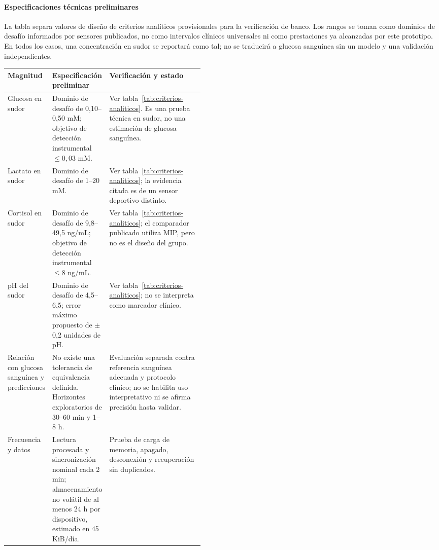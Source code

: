 \paragraph{Especificaciones técnicas preliminares}\label{sec:especificaciones}
La tabla separa valores de diseño de criterios analíticos provisionales para la verificación de banco. Los rangos se toman como dominios de desafío informados por sensores publicados, no como intervalos clínicos universales ni como prestaciones ya alcanzadas por este prototipo. En todos los casos, una concentración en sudor se reportará como tal; no se traducirá a glucosa sanguínea sin un modelo y una validación independientes.

{\small
\renewcommand{\arraystretch}{1.15}
\begin{tabularx}{\linewidth}{|>{\raggedright\arraybackslash}p{0.20\linewidth}|>{\raggedright\arraybackslash}p{0.25\linewidth}|>{\raggedright\arraybackslash}X|}
\hline
\textbf{Magnitud} & \textbf{Especificación preliminar} & \textbf{Verificación y estado}\\\hline
Glucosa en sudor & Dominio de desafío de 0,10--0,50 mM; objetivo de detección instrumental $\leq0{,}03$ mM. & Ver tabla~\ref{tab:criterios-analiticos}. Es una prueba técnica en sudor, no una estimación de glucosa sanguínea.\\\hline
Lactato en sudor & Dominio de desafío de 1--20 mM. & Ver tabla~\ref{tab:criterios-analiticos}; la evidencia citada es de un sensor deportivo distinto.\\\hline
Cortisol en sudor & Dominio de desafío de 9,8--49,5 ng/mL; objetivo de detección instrumental $\leq$8 ng/mL. & Ver tabla~\ref{tab:criterios-analiticos}; el comparador publicado utiliza MIP, pero no es el diseño del grupo.\\\hline
pH del sudor & Dominio de desafío de 4,5--6,5; error máximo propuesto de $\pm$0,2 unidades de pH. & Ver tabla~\ref{tab:criterios-analiticos}; no se interpreta como marcador clínico.\\\hline
Relación con glucosa sanguínea y predicciones & No existe una tolerancia de equivalencia definida. Horizontes exploratorios de 30--60 min y 1--8 h. & Evaluación separada contra referencia sanguínea adecuada y protocolo clínico; no se habilita uso interpretativo ni se afirma precisión hasta validar.\\\hline
Frecuencia y datos & Lectura procesada y sincronización nominal cada 2 min; almacenamiento no volátil de al menos 24 h por dispositivo, estimado en 45 KiB/día. & Prueba de carga de memoria, apagado, desconexión y recuperación sin duplicados.\\\hline

\end{tabularx}}
